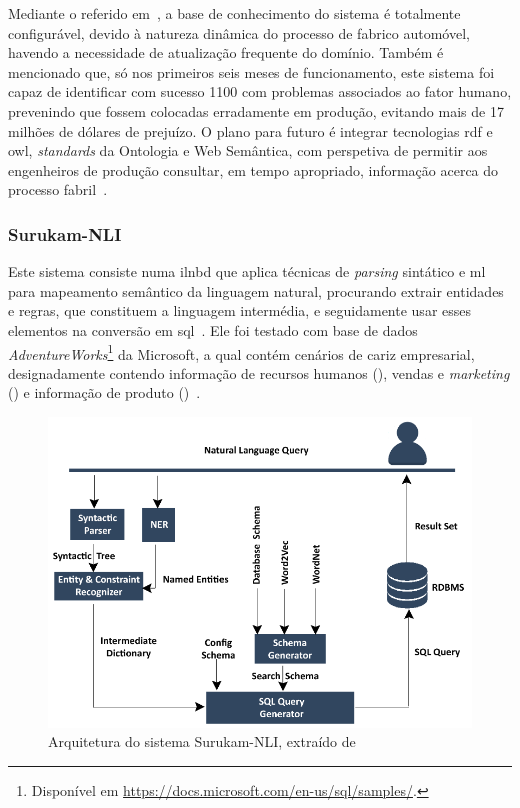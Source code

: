 Mediante o referido em~\textcite{intelligent_systems_manufacturing_ford}, a base de conhecimento do sistema é totalmente configurável, devido à natureza dinâmica do processo de fabrico automóvel, havendo a necessidade de atualização frequente do domínio. Também é mencionado que, só nos primeiros seis meses de funcionamento, este sistema foi capaz de identificar com sucesso 1100  com problemas associados ao fator humano, prevenindo que fossem colocadas erradamente em produção, evitando mais de 17 milhões de dólares de prejuízo. O plano para futuro é integrar tecnologias \gls{rdf} e \gls{owl}, \textit{standards} da Ontologia e Web Semântica, com perspetiva de permitir aos engenheiros de produção consultar, em tempo apropriado, informação acerca do processo fabril~\parencite{intelligent_systems_manufacturing_ford}.

\subsubsection*{Surukam-NLI}
Este sistema consiste numa \gls{ilnbd} que aplica técnicas de  \textit{parsing} sintático e \gls{ml} para mapeamento semântico da linguagem natural, procurando extrair entidades e regras, que constituem a linguagem intermédia, e seguidamente usar esses elementos na conversão em \gls{sql}~\parencite{towards_building_domain_agnostic_nli}. Ele foi testado com base de dados \textit{AdventureWorks}\footnote{Disponível em \url{https://docs.microsoft.com/en-us/sql/samples/}.} da Microsoft, a qual contém cenários de cariz empresarial, designadamente contendo informação de recursos humanos (), vendas e \textit{marketing} () e informação de produto ()~\parencite{towards_building_domain_agnostic_nli}.
%
\begin{figure}
    \centering
    \includegraphics[width=.8\textwidth]{ch03/assets/surukam-architecture.png}
    \caption{Arquitetura do sistema Surukam-NLI, extraído de~\textcite{towards_building_domain_agnostic_nli}}
    \label{fig:surukam_architecture}
\end{figure}

